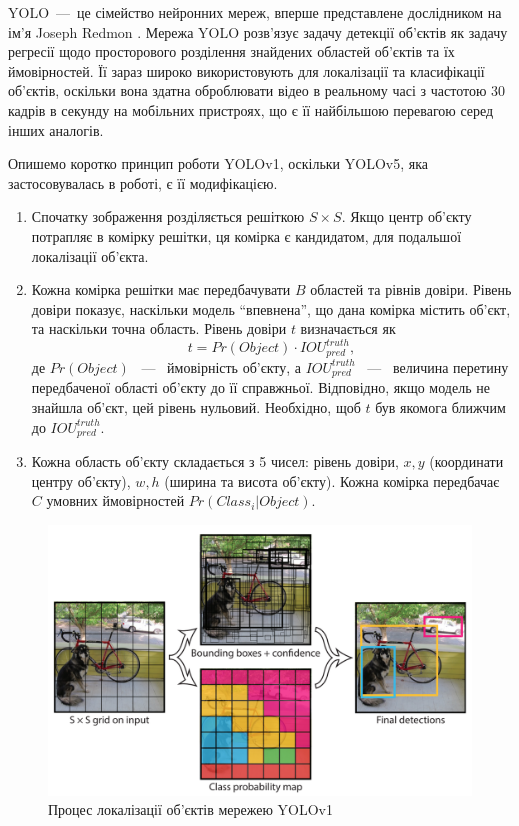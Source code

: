 YOLO~---~це сімейство нейронних мереж, вперше представлене дослідником на ім'я Joseph Redmon \cite{yolov1}.
Мережа YOLO розв'язує задачу детекції об'єктів як задачу регресії
щодо просторового розділення знайдених областей об'єктів та їх
ймовірностей. Її зараз широко використовують для локалізації та класифікації об'єктів,
оскільки вона здатна оброблювати відео в реальному часі з частотою 30 кадрів в секунду
на мобільних пристроях, що є її найбільшою перевагою серед інших аналогів.

Опишемо коротко принцип роботи YOLOv1, оскільки YOLOv5, яка застосовувалась
в роботі, є її модифікацією.
\begin{enumerate}
    \item Спочатку зображення розділяється решіткою $S \times S$.
          Якщо центр об'єкту потрапляє в комірку решітки, ця комірка
          є кандидатом, для подальшої локалізації об'єкта.
    \item Кожна комірка решітки має передбачувати $B$ областей та рівнів
          довіри. Рівень довіри показує, наскільки модель ``впевнена'',
          що дана комірка містить об'єкт, та наскільки точна область.
          Рівень довіри $t$ визначається  як
          \begin{equation*}
              t = Pr(Object) \cdot {IOU}_{pred}^{truth},
          \end{equation*}
          де $Pr(Object)$ ~---~ ймовірність об'єкту, а ${IOU}_{pred}^{truth}$ ~---~ величина
          перетину передбаченої області об'єкту до її справжньої.
          Відповідно, якщо модель не знайшла об'єкт, цей рівень нульовий.
          Необхідно, щоб $t$ був якомога ближчим до ${IOU}_{pred}^{truth}$.
    \item Кожна область об'єкту складається з 5 чисел: рівень довіри,
          $x, y$ (координати центру об'єкту),  $w, h$ (ширина та висота об'єкту).
          Кожна комірка передбачає $C$ умовних ймовірностей $Pr(Class_i|Object)$.
\end{enumerate}

\begin{figure}[H]
    \includegraphics[width=0.5\linewidth]{images/cnn_yolo1}
    \centering
    \caption{Процес локалізації об'єктів мережею YOLOv1 \cite{yolov1}
    }
\end{figure}

